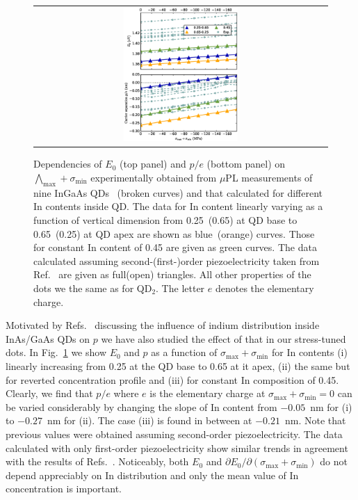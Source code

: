 \documentclass[aps,prl,amsmath,amssymb,twocolumn,showpacs,showkeys,superscriptaddress]{revtex4-1}
\begin{document}
\begin{figure}[!ht]
\renewcommand{\tabcolsep}{2pt}
\begin{center}
\begin{tabular}{c}
\includegraphics[width=0.4\textwidth]{2018-02-06__171219_8x8_neotocena_++_nn+_35deg_pres350___40x20x3_concentration} \\
\end{tabular}
\end{center}
\caption{
Dependencies of $E_0$ (top panel) and $p/e$ (bottom panel) on $\bigwedge_{\mathrm{max}}+\sigma_{\mathrm{min}}$ experimentally obtained from $\mu$PL measurements of nine InGaAs QDs~\cite{Aberl:17} (broken curves) and that calculated for different In contents inside QD. The data for In content linearly varying as a function of vertical dimension from 0.25~(0.65) at QD base to 0.65~(0.25) at QD apex are shown as blue~(orange) curves. Those for constant In content of 0.45 are given as green curves. The data calculated assuming second-(first-)order piezoelectricity taken from Ref.~\citep{Beya-Wakata2011} are given as full(open) triangles. All other properties of the dots we the same as for QD$_2$. The letter $e$ denotes the elementary charge.
\label{fig:TuningByConc}}
\end{figure}
%

Motivated by Refs.~\cite{Fry:00,Grundmann:95} discussing the influence of indium distribution inside InAs/GaAs QDs on $p$ we have also studied the effect of that in our stress-tuned dots. In Fig.~\ref{fig:TuningByConc} we show $E_0$ and $p$ as a function of $\sigma_{\mathrm{max}}+\sigma_{\mathrm{min}}$ for In contents (i) linearly increasing from 0.25 at the QD base to 0.65 at it apex, (ii) the same but for reverted concentration profile and (iii) for constant In composition of 0.45. Clearly, we find that $p/e$ where $e$ is the elementary charge at $\sigma_{\mathrm{max}}+\sigma_{\mathrm{min}}=0$ can be varied considerably by changing the slope of In content from $-0.05$~nm for (i) to $-0.27$~nm for (ii). The case (iii) is found in between at $-0.21$~nm. Note that previous values were obtained assuming second-order piezoelectricity. The data calculated with only first-order piezoelectricity show similar trends in agreement with the results of Refs.~\cite{Fry:00,Grundmann:95}. Noticeably, both $E_0$ and $\partial E_0/\partial(\sigma_{\mathrm{max}}+\sigma_{\mathrm{min}})$ do not depend appreciably on In distribution and only the mean value of In concentration is important.
\end{document}
